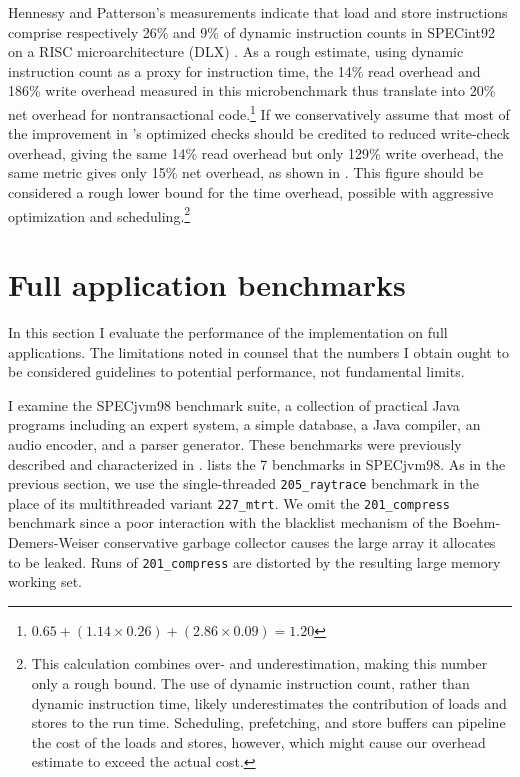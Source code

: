 
Hennessy and Patterson's measurements indicate that load and store
instructions comprise respectively 26\% and 9\% of dynamic instruction
counts in SPECint92 on a RISC microarchitecture (DLX)
\cite[p. 105]{HennessyPa96}.
As a rough estimate, using dynamic instruction count as a proxy for
instruction time,
the 14\% read overhead and 186\% write overhead measured
in this microbenchmark thus translate into 20\% net overhead for
nontransactional code.\footnote{$0.65 + (1.14 \times 0.26) + (2.86
  \times 0.09) = 1.20$} If we conservatively assume that most of the
improvement in 's optimized checks should be credited
to reduced write-check overhead, giving the same 14\% read overhead
but only 129\% write overhead, the same metric gives only 15\% net
overhead, as shown in .  This figure should be
considered a rough lower bound for the time overhead, possible with
aggressive optimization and scheduling.\footnote{This
  calculation combines over- and underestimation, making this number
  only a rough bound.  The use of dynamic instruction count, rather
  than dynamic instruction time, likely underestimates the
  contribution of loads and stores to the run time.
  Scheduling, prefetching, and store buffers can pipeline the cost of
  the loads and stores, however, which might cause our overhead estimate to
  exceed the actual cost.  }

\section{Full application benchmarks}\label{sec:full-bench}
In this section I evaluate the performance of the \apex implementation
on full applications.
The limitations noted in 
counsel that the numbers I obtain ought to be considered
guidelines to potential performance, not fundamental limits.

I examine the SPECjvm98 benchmark suite, a collection of
practical Java programs including an expert system, a simple database,
a Java compiler, an audio encoder, and a parser generator.  These
benchmarks were previously described and characterized in
.
 lists the 7 benchmarks in SPECjvm98.  As in the
previous section, we use the single-threaded {\tt 205\_raytrace} benchmark
in the place of its multithreaded variant {\tt 227\_mtrt}.  We omit the
{\tt 201\_compress} benchmark since a poor
interaction with the blacklist mechanism of the Boehm-Demers-Weiser
conservative garbage collector causes the large array it allocates to
be leaked.  Runs of {\tt 201\_compress} are distorted by
the resulting large memory working set.

